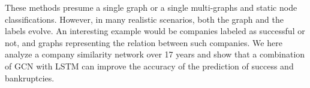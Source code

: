 \begin{itemize}
\end{itemize}

These methods presume a single graph or a single multi-graphs and static node classifications. However, in many realistic scenarios, both the graph and the labels evolve. An interesting example would be companies labeled as successful or not, and graphs representing the relation between such companies. We here analyze a company similarity network over 17 years and show that a combination of GCN with LSTM can improve the accuracy of the prediction of success and bankruptcies.
